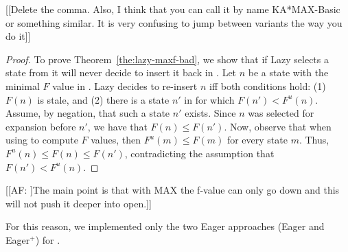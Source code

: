 [[Delete the comma. Also, I think that you can call it by name KA*MAX-Basic or something similar. It is very confusing to jump between variants the way you do it]]

\begin{proof}
  To prove Theorem~\ref{the:lazy-maxf-bad}, we show that if Lazy \kastarmax selects a state from \open it will never decide to insert it back in \open.
  Let $n$ be a state with the minimal $F$ value in \open.
  Lazy \kastar decides to re-insert $n$ iff both conditions hold: (1) $F(n)$ is stale, and
  (2) there is a state $n'$ in \open for which $F(n')<F^u(n)$. %
  Assume, by negation, that such a state $n'$ exists.
  Since $n$ was selected for expansion before $n'$, we have that $F(n)\leq F(n')$.
  Now, observe that when using \maxf to compute $F$ values, then $F^u(m)\leq F(m)$ for every state $m$.
  Thus, $F^u(n)\leq F(n) \leq F(n')$, contradicting the assumption that $F(n')<F^u(n)$.
\end{proof}

[[AF: ]The main point is that with MAX the f-value can only go down and this will not push it deeper into open.]]

For this reason, we implemented only the two Eager approaches (Eager and Eager$^+$) for \kastarmax.


